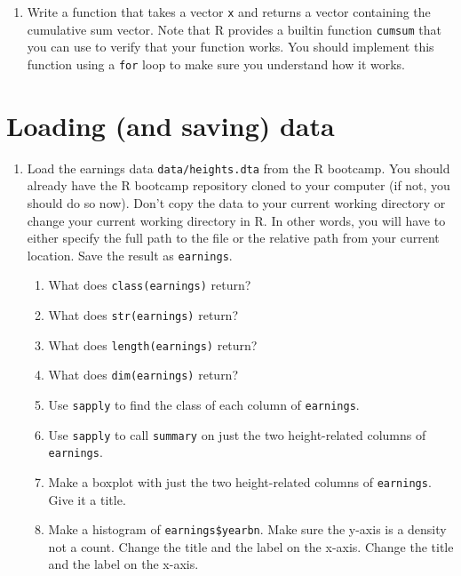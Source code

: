 \documentclass{article}
\begin{document}
\begin{enumerate}
\item Write a function that takes a vector \texttt{x} and returns a vector
      containing the cumulative sum vector.  Note that R provides a builtin
      function \texttt{cumsum} that you can use to verify that your function
      works.  You should implement this function using a \texttt{for} loop
      to make sure you understand how it works.

\end{enumerate}

\section*{Loading (and saving) data}

\begin{enumerate}

\item Load the earnings data \texttt{data/heights.dta} from the R bootcamp.
      You should already have the R bootcamp repository cloned to your
      computer (if not, you should do so now).  Don't copy the data to your
      current working directory or change your current working directory in
      R.  In other words, you will have to either specify the full path
      to the file or the relative path from your current location.  Save
      the result as \texttt{earnings}.

    \begin{enumerate}
    \item What does \texttt{class(earnings)} return?
    \item What does \texttt{str(earnings)} return?
    \item What does \texttt{length(earnings)} return?
    \item What does \texttt{dim(earnings)} return?
    \item Use \texttt{sapply} to find the class of each column of
          \texttt{earnings}.
    \item Use \texttt{sapply} to call \texttt{summary} on just the two
          height-related columns of \texttt{earnings}.
    \item Make a boxplot with just the two height-related columns of
          \texttt{earnings}. Give it a title.
    \item Make a histogram of \texttt{earnings\$yearbn}. Make sure the
          y-axis is a density not a count. Change the title and the
          label on the x-axis. Change the title and the
          label on the x-axis. 
    \end{enumerate}



\end{enumerate}
\end{document}
